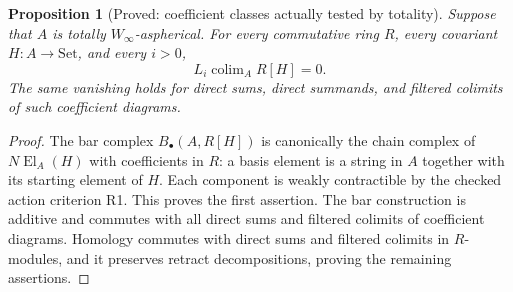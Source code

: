 \documentclass[11pt,a4paper]{article}
\newtheorem{proposition}[theorem]{Proposition}
\theoremstyle{definition}
\begin{document}
\begin{proposition}[Proved: coefficient classes actually tested by totality]\label{main:tested}
Suppose that $A$ is totally $W_\infty$-aspherical. For every commutative ring
$R$, every covariant $H:A\to\mathrm{Set}$, and every $i>0$,
\[
 L_i\operatorname{colim}_A R[H]=0.
\]
The same vanishing holds for direct sums, direct summands, and filtered
colimits of such coefficient diagrams.
\end{proposition}
\begin{proof}
The bar complex $B_\bullet(A,R[H])$ is canonically the chain complex of
$N\operatorname{El}_A(H)$ with coefficients in $R$: a basis element is a
string in $A$ together with its starting element of $H$. Each component
is weakly contractible by the checked action criterion R1. This proves
the first assertion. The bar construction is additive and commutes with
all direct sums and filtered colimits of coefficient diagrams. Homology
commutes with direct sums and filtered colimits in $R$-modules, and it
preserves retract decompositions, proving the remaining assertions.
\end{proof}
\end{document}
